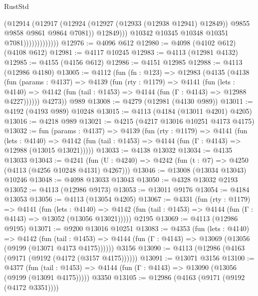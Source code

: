 \begin{lexlean}{RustStd}
\begin{coremodule}
                                  (@12914
                                    (@12917
                                      (@12924
                                        (@12927 (@12933 (@12938 @12941) @12849))
                                        @9855
                                        @9858
                                        @9861
                                        @9864
                                        @7081))
                                    @12849)))
                              @10342
                              @10345
                              @10348
                              @10351
                              @7081)))))))))))))
@12976 := @4096 @612
@12980 := @4098 (@4102 @612) (@4108 @612)
@12981 := @4117 @10245
@12983 := @4113 (@12981 @4132)
@12985 := @4155 (@4156 @612)
@12986 := @4151 @12985
@12988 := @4113 (@12986 @4180)
@13005 := @4112
    (fun (fn : @123) =>
    @12983
      (@4135
        (@4138
          (fun (params : @4137) =>
          @4139
            (fun (rty : @1179) =>
            @4141
              (fun (lets : @4140) =>
              @4142 (fun (tail : @1453) => @4144 (fun (Γ : @4143) => @12988 @4227))))))
        @4273))
    @989
@13008 := @4279 (@12981 (@4130 @989))
@13011 := @4192 (@4193 @989) @10248
@13015 := @4113 (@4184 (@13011 @4201) @4205)
@13016 := @4218 @989
@13021 := @4215 (@4217 @13016 @10251 @4173 @4175)
@13032 := fun (params : @4137) =>
  @4139
    (fun (rty : @1179) =>
    @4141
      (fun (lets : @4140) =>
      @4142 (fun (tail : @1453) => @4144 (fun (Γ : @4143) => @12988 (@13015 @13021)))))
@13033 := @4138 @13032
@13034 := @4135 @13033
@13043 := @4241
    (fun (U : @4240) => @4242 (fun (t : @7) => @4250 (@4113 (@4256 @10248 @4131) @4267)))
@13046 := @13008 (@13034 @13043) @10246
@13048 := @4098 @13033 @13043
@13050 := @4328 @13032 @2193
@13052 := @4113 (@12986 @9173)
@13053 := @13011 @9176
@13054 := @4184 @13053
@13056 := @4113 (@13054 @4205)
@13067 := @4331
    (fun (rty : @1179) =>
    @4141
      (fun (lets : @4140) =>
      @4142 (fun (tail : @1453) => @4144 (fun (Γ : @4143) => @13052 (@13056 @13021)))))
    @2195
@13069 := @4113 (@12986 @9195)
@13071 := @9200 @13016 @10251
@13083 := @4353
    (fun (lets : @4140) =>
    @4142
      (fun (tail : @1453) =>
      @4144 (fun (Γ : @4143) => @13069 (@13056 (@9199 (@13071 @4173 @4175))))))
    @3156
@13090 := @4113 (@12986 (@4163 (@9171 (@9192 (@4172 (@3157 @4175))))))
@13091 := @13071 @3156
@13100 := @4377
    (fun (tail : @1453) => @4144 (fun (Γ : @4143) => @13090 (@13056 (@9199 (@13091 @4175)))))
    @3350
@13105 := @12986 (@4163 (@9171 (@9192 (@4172 @3351))))

\end{coremodule}
\end{lexlean}
